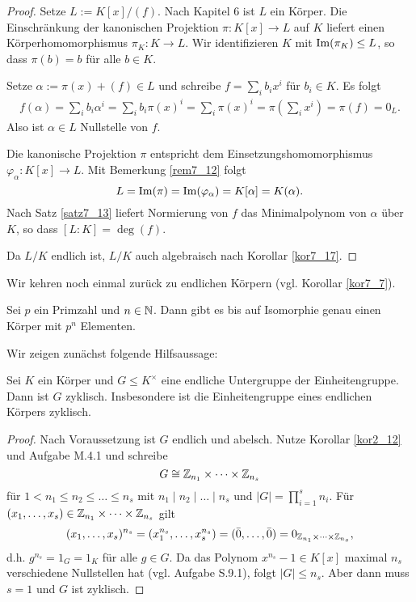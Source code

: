 \begin{proof}
	Setze $L := K[x]/(f)$. Nach Kapitel 6 ist $L$ ein Körper. Die Einschränkung der kanonischen Projektion $\pi \colon K[x] \to L$ auf $K$ liefert einen Körperhomomorphismus $\pi_K \colon K \to L$. Wir identifizieren $K$ mit $\mathrm{Im}(\pi_K) \leq L$, so dass $\pi(b) = b$ für alle $b \in K$. 
	
	Setze $\alpha := \pi(x) + (f) \in L$ und schreibe $f = \sum_{i} b_i x^i$ für $b_i \in K$. Es folgt
	\begin{align*}
		f(\alpha) = \sum_{i} b_i \alpha^i = \sum_i b_i \pi(x)^i = \sum_{i} \pi(x)^i = \pi\left(\sum_{i} x^i\right) = \pi(f) = 0_L.
 	\end{align*}
 	Also ist $\alpha \in L$ Nullstelle von $f$.
 	
 	Die kanonische Projektion $\pi$ entspricht dem Einsetzungshomomorphismus $\varphi_\alpha \colon K[x] \to L$. Mit Bemerkung \ref{rem7_12} folgt
 	\[L = \mathrm{Im}(\pi) = \mathrm{Im}(\varphi_\alpha) = K[\alpha] = K(\alpha).\]
 	Nach Satz \ref{satz7_13} liefert Normierung von $f$ das Minimalpolynom von $\alpha$ über $K$, so dass $[L:K] = \deg(f)$.
 	
 	Da $L/K$ endlich ist, $L/K$ auch algebraisch nach Korollar \ref{kor7_17}.
\end{proof}
Wir kehren noch einmal zurück zu endlichen Körpern (vgl. Korollar \ref{kor7_7}).
\begin{satz}\label{satz7_20}
	Sei $p$ ein Primzahl und $n \in \mathbb{N}$. Dann gibt es bis auf Isomorphie genau einen Körper mit $p^n$ Elementen.
\end{satz}
Wir zeigen zunächst folgende Hilfsaussage:
\begin{prop}\label{prop7_21}
	Sei $K$ ein Körper und $G \leq K^\times$ eine endliche Untergruppe der Einheitengruppe. Dann ist $G$ zyklisch. Insbesondere ist die Einheitengruppe eines endlichen Körpers zyklisch. 
\end{prop}
\begin{proof}
	Nach Voraussetzung ist $G$ endlich und abelsch. Nutze Korollar \ref{kor2_12} und Aufgabe M.4.1 und schreibe
	\[G \cong \mathbb{Z}_{n_1} \times \dots \times \mathbb{Z}_{n_s}\]
	für $1 < n_1 \leq n_2 \leq \dots \leq n_s$ mit $n_1 \mid n_2 \mid \dots \mid n_s$ und $|G| = \prod_{i=1}^{s} n_i$. Für $(x_1, \dots, x_s) \in \mathbb{Z}_{n_1} \times \dots \times \mathbb{Z}_{n_s}$ gilt
	\[(x_1, \dots, x_s)^{n_s} = (x_1^{n_s}, \dots, x_s^{n_s}) = (\bar{0}, \dots, \bar{0}) = 0_{\mathbb{Z}_{n_1} \times \dots \times \mathbb{Z}_{n_s}},\]
	d.h. $g^{n_s} = 1_G = 1_K$ für alle $g \in G$. Da das Polynom $x^{n_s} - 1 \in K[x]$ maximal $n_s$ verschiedene Nullstellen hat (vgl. Aufgabe S.9.1), folgt $|G| \leq n_s$. Aber dann muss $s = 1$ und $G$ ist zyklisch.
\end{proof}
